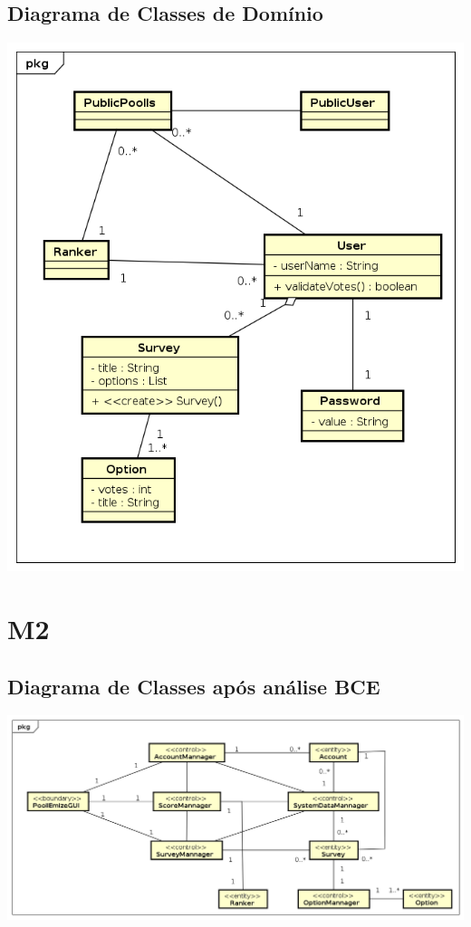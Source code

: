 \documentclass[a4paper,12pt]{report}
\begin{document}
\newpage
\section*{Diagrama de Classes de Domínio}
\markright{}
\includegraphics[width=14.3cm]{class_diagrams/DomainClassDiagram.png}

\chapter*{M2}
\markright{}
\section*{Diagrama de Classes após análise BCE}
\markright{}
\includegraphics[width=14.3cm]{class_diagrams/BCEClassDiagram.png}
\end{document}
